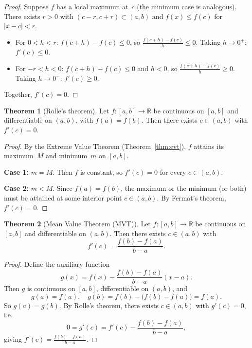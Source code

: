 \documentclass[12pt,a4paper,openany]{book}
\theoremstyle{definition}
\newtheorem{theorem}{Theorem}[chapter]
\theoremstyle{remark}
\begin{document}
\begin{proof}
Suppose $f$ has a local maximum at~$c$ (the minimum case is
analogous).  There exists $r>0$ with $(c-r,c+r)\subset(a,b)$ and
$f(x)\le f(c)$ for $|x-c|<r$.

\begin{itemize}
\item For $0<h<r$: $f(c+h)-f(c)\le 0$, so
  $\frac{f(c+h)-f(c)}{h}\le 0$.  Taking $h\to 0^+$:
  $f'(c)\le 0$.
\item For $-r<h<0$: $f(c+h)-f(c)\le 0$ and $h<0$, so
  $\frac{f(c+h)-f(c)}{h}\ge 0$.  Taking $h\to 0^-$:
  $f'(c)\ge 0$.
\end{itemize}
Together, $f'(c)=0$.
\end{proof}

\begin{theorem}[Rolle's theorem]\label{thm:rolle}
Let $f\colon[a,b]\to\mathbb{R}$ be continuous on $[a,b]$ and
differentiable on $(a,b)$, with $f(a)=f(b)$.  Then there exists
$c\in(a,b)$ with $f'(c)=0$.
\end{theorem}

\begin{proof}
By the Extreme Value Theorem (Theorem~\ref{thm:evt}), $f$ attains
its maximum~$M$ and minimum~$m$ on $[a,b]$.

\textbf{Case 1:} $m=M$.  Then $f$ is constant, so $f'(c)=0$ for
every $c\in(a,b)$.

\textbf{Case 2:} $m<M$.  Since $f(a)=f(b)$, the maximum or the
minimum (or both) must be attained at some interior point $c\in(a,b)$.
By Fermat's theorem, $f'(c)=0$.
\end{proof}

\begin{theorem}[Mean Value Theorem (MVT)]\label{thm:mvt}
Let $f\colon[a,b]\to\mathbb{R}$ be continuous on $[a,b]$ and
differentiable on $(a,b)$.  Then there exists $c\in(a,b)$ with
\[
  f'(c) = \frac{f(b)-f(a)}{b-a}.
\]
\end{theorem}

\begin{proof}
Define the auxiliary function
\[
  g(x) = f(x) - \frac{f(b)-f(a)}{b-a}(x-a).
\]
Then $g$ is continuous on $[a,b]$, differentiable on $(a,b)$, and
\[
  g(a)=f(a), \quad
  g(b)=f(b)-\bigl(f(b)-f(a)\bigr)=f(a).
\]
So $g(a)=g(b)$.  By Rolle's theorem, there exists $c\in(a,b)$ with
$g'(c)=0$, i.e.\
\[
  0 = g'(c) = f'(c) - \frac{f(b)-f(a)}{b-a},
\]
giving $f'(c)=\frac{f(b)-f(a)}{b-a}$.
\end{proof}
\end{document}
